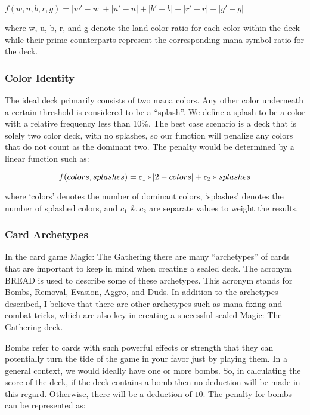 \documentclass[12pt, letterpaper]{article}
\begin{document}
$f(w,u,b,r,g)=|w'-w|+|u'-u|+|b'-b|+|r'-r|+|g'-g|$

where w, u, b, r, and g denote the land color ratio for each color within the deck
while their prime counterparts represent the corresponding mana symbol ratio for the deck.

\subsubsection{Color Identity}
\label{objective:Color Identity}

The ideal deck primarily consists of two mana colors.
Any other color underneath a certain threshold is considered to be a \enquote{splash}.
We define a splash to be a color with a relative frequency less than 10\%.
The best case scenario is a deck that is solely two color deck, with no splashes,
so our function will penalize any colors that do not count as the dominant two.
The penalty would be determined by a linear function such as:

$$
f(colors, splashes) = c_1 * \abs{2 - colors} + c_2 * splashes
$$

where `colors' denotes the number of dominant colors,
`splashes' denotes the number of splashed colors,
and $ c_1 $ \& $ c_2 $ are separate values to weight the results.

\subsubsection{Card Archetypes}
\label{objective:Card Archetypes}

In the card game Magic: The Gathering there are many \enquote{archetypes} of cards that are
important to keep in mind when creating a sealed deck.
The acronym BREAD is used to describe some of these archetypes.
This acronym stands for Bombs, Removal, Evasion, Aggro, and Duds.
In addition to the archetypes described,
I believe that there are other archetypes such as
mana-fixing and combat tricks,
which are also key in creating a successful sealed Magic: The Gathering deck.

Bombs refer to cards with such powerful effects or strength that they can potentially turn
the tide of the game in your favor just by playing them.
In a general context, we would ideally have one or more bombs.
So, in calculating the score of the deck,
if the deck contains a bomb
then no deduction will be made in this regard.
Otherwise, there will be a deduction of $ 10 $.
The penalty for bombs can be represented as:
\end{document}
